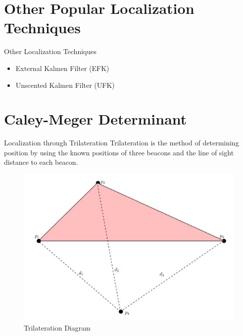 \documentclass{beamer}
\begin{document}

\section{Other Popular Localization Techniques}
	
\begin{frame}{Other Localization Techniques}

\begin{itemize}
\item External Kalmen Filter (EFK)

\item Unscented Kalmen Filter (UFK)

\end{itemize}

\end{frame}


\section{Caley-Meger Determinant}


\begin{frame}{Localization through Trilateration}
Trilateration is the method of determining position by using the known positions of three beacons and the line of sight distance to each beacon.

\begin{figure}
\includegraphics[scale=0.7]{figs/img/Lu_images/robotTrilaterationDiagram}
\caption{Trilateration Diagram}
\end{figure}  

\end{frame}
\end{document}
